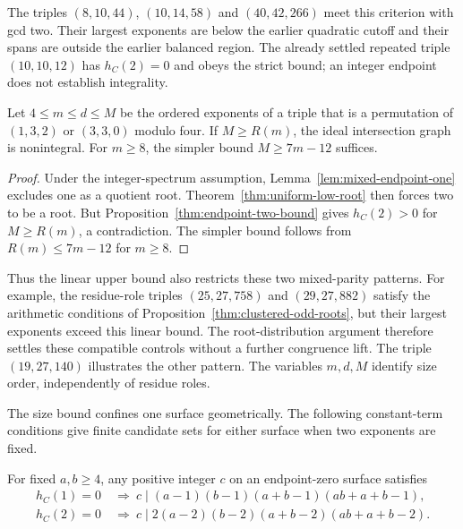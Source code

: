 The triples $(8,10,44)$, $(10,14,58)$ and $(40,42,266)$ meet this
criterion with gcd two. Their largest exponents are below the earlier
quadratic cutoff and their spans are outside the earlier balanced region.
The already settled repeated triple $(10,10,12)$ has $h_C(2)=0$ and
obeys the strict bound; an integer endpoint does not establish integrality.

\begin{proposition}
\label{cor:mixed-linear-tail}
Let $4\leq m\leq d\leq M$ be the ordered exponents of a triple that is
a permutation of $(1,3,2)$ or $(3,3,0)$ modulo four.
If $M\geq R(m)$, the ideal intersection graph is nonintegral.
For $m\geq8$, the simpler bound $M\geq7m-12$ suffices.
\end{proposition}

\begin{proof}
Under the integer-spectrum assumption,
Lemma~\ref{lem:mixed-endpoint-one} excludes one as a quotient root.
Theorem~\ref{thm:uniform-low-root} then forces two to be a root.
But Proposition~\ref{thm:endpoint-two-bound} gives $h_C(2)>0$ for
$M\geq R(m)$, a contradiction. The simpler bound follows from
$R(m)\leq7m-12$ for $m\geq8$.
\end{proof}

Thus the linear upper bound also restricts these two mixed-parity patterns.
For example, the residue-role triples $(25,27,758)$ and $(29,27,882)$
satisfy the arithmetic conditions of Proposition~\ref{thm:clustered-odd-roots},
but their largest exponents exceed this linear bound. The root-distribution
argument therefore settles these compatible controls without a further
congruence lift. The triple $(19,27,140)$ illustrates the other pattern.
The variables $m,d,M$ identify size order, independently of residue roles.

The size bound confines one surface geometrically. The following
constant-term conditions give finite candidate sets for either surface
when two exponents are fixed.

\begin{proposition}
\label{prop:endpoint-divisors}
For fixed $a,b\geq4$, any positive integer $c$ on an endpoint-zero
surface satisfies
\begin{align*}
h_C(1)=0&\ \Longrightarrow\ c\mid(a-1)(b-1)(a+b-1)(ab+a+b-1),\\
h_C(2)=0&\ \Longrightarrow\ c\mid2(a-2)(b-2)(a+b-2)(ab+a+b-2).
\end{align*}
\end{proposition}


